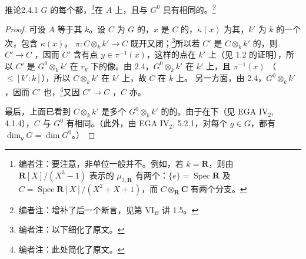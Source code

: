\begin{SGAresult}{推论}{2.4.1}
$G$ 的每个都，\footnote{编者注：要注意，非单位一般并不。例如，若 $k=\mathbf R$，则由 $\mathbf R[X]/(X^3-1)$ 表示的 $\mu_{3,\mathbf R}$ 有两个：$\{e\}=\operatorname{Spec}\mathbf R$ 及 $C=\operatorname{Spec}\mathbf R[X]/(X^2+X+1)$，而 $C\otimes_{\mathbf R}\mathbf C$ 有两个分支。}在 $A$ 上，且与 $G^0$ 具有相同的。\footnote{编者注：增补了后一个断言，见第 VI$_B$ 讲 1.5。}
\end{SGAresult}
\begin{proof}
可设 $A$ 等于其 $k$。设 $C$ 为 $G$ 的，$x$ 是 $C$ 的，$\kappa(x)$ 为其，$k'$ 为 $k$ 的一个次，包含 $\kappa(x)$。 $\pi:C\otimes_k k'\to C$ 既开又闭；\footnote{编者注：以下细化了原文。}所以若 $C'$ 是 $C\otimes_k k'$ 的，则 $C'\to C$ ，因而 $C'$ 含有点 $y\in\pi^{-1}(x)$，这样的点在 $k'$ 上（见 1.2 的证明），所以 $C'$ 是 $G^0\otimes_k k'$ 在 $r_y$ 下的像。由 2.4，$G^0\otimes_k k'$ 在 $k'$ 上，且 $\pi^{-1}(x)$ （ $\leq[k':k]$），所以 $C\otimes_k k'$ 在 $k'$ 上，故 $C$ 在 $k$ 上。
另一方面，由 2.4，$G^0\otimes_k k'$ ，因而 $C'$ 也，\footnote{编者注：此处简化了原文。}又因 $C'\to C$ ，$C$ 亦。

最后，上面已看到 $C\otimes_k k'$ 是多个 $G^0\otimes_k k'$ 的的。由于在下（见 EGA IV$_2$, 4.1.4），$C$ 与 $G^0$ 有相同。（此外，由 EGA IV$_2$, 5.2.1，对每个 $g\in G$，都有 $\dim_gG=\dim G^0$。）
\end{proof}

